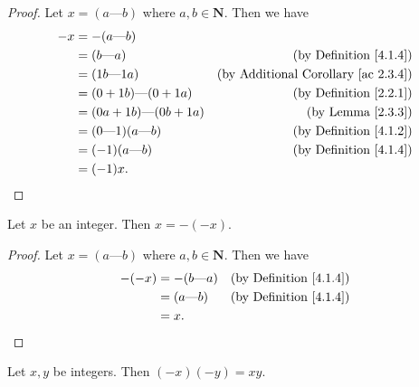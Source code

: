 \begin{proof}
    Let \(x = (a \text{---} b)\) where \(a, b \in \mathbf{N}\).
    Then we have
    \begin{align*}
        -x & = -(a \text{---} b)                                                                  \\
           & = (b \text{---} a)                 & \text{(by Definition \ref{4.1.4})}              \\
           & = (1b \text{---} 1a)               & \text{(by Additional Corollary \ref{ac 2.3.4})} \\
           & = (0 + 1b) \text{---} (0 + 1a)     & \text{(by Definition \ref{2.2.1})}              \\
           & = (0a + 1b) \text{---} (0b + 1a)   & \text{(by Lemma \ref{2.3.3})}                   \\
           & = (0 \text{---} 1)(a \text{---} b) & \text{(by Definition \ref{4.1.2})}              \\
           & = (-1)(a \text{---} b)             & \text{(by Definition \ref{4.1.4})}              \\
           & = (-1)x.
    \end{align*}
\end{proof}

\begin{additional corollary}\label{ac 4.1.4}
Let \(x\) be an integer.
Then \(x = -(-x)\).
\end{additional corollary}

\begin{proof}
    Let \(x = (a \text{---} b)\) where \(a, b \in \mathbf{N}\).
    Then we have
    \begin{align*}
        -(-x) & = -(b \text{---} a) & \text{(by Definition \ref{4.1.4})} \\
              & = (a \text{---} b)  & \text{(by Definition \ref{4.1.4})} \\
              & = x.
    \end{align*}
\end{proof}

\begin{additional corollary}\label{ac 4.1.5}
Let \(x, y\) be integers.
Then \((-x)(-y) = xy\).
\end{additional corollary}

